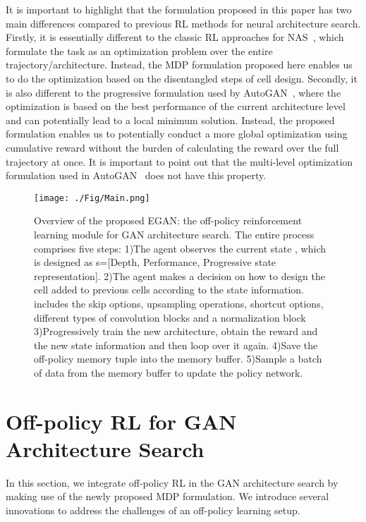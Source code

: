 \documentclass[runningheads]{llncs}
\begin{document}
It is important to highlight that the  formulation proposed in this paper has two main differences compared to previous RL methods for neural architecture search. Firstly, it is essentially different to the classic RL approaches for NAS~\cite{zoph2016neural}, which formulate the task as an optimization problem over the entire trajectory/architecture. Instead, the MDP formulation proposed here enables us to do the optimization based on the disentangled steps of cell design. Secondly, it is also different to the progressive formulation used by AutoGAN~\cite{gong2019autogan}, where the optimization is based on the best performance of the current architecture level and can potentially lead to a local minimum solution. Instead, the proposed formulation enables us to potentially conduct a more global optimization using cumulative reward without the burden of calculating the reward over the full trajectory at once. It is important to point out that the multi-level optimization formulation used in AutoGAN~\cite{gong2019autogan} does not have this property. 



\begin{figure}[htbp]
    \centering
    \texttt{[image: ./Fig/Main.png]}
    \caption{Overview of the proposed EGAN: the off-policy reinforcement learning module for GAN architecture search. The entire process comprises five steps: 1)The agent observes the current state , which is designed as  s=[Depth, Performance, Progressive state representation]. 2)The agent makes a decision  on how to design the cell added to previous cells according to the state information.   includes the skip options, upsampling operations, shortcut options, different types of convolution blocks and a normalization block 3)Progressively train the new architecture, obtain the reward  and the new state  information and then loop over it again. 4)Save the off-policy memory tuple  into the memory buffer. 5)Sample a batch of data from the memory buffer to update the policy network.}
\label{fig:main}
\end{figure}

\section{Off-policy RL for GAN Architecture Search}\label{sec:proposed method}

In this section, we integrate off-policy RL in the GAN architecture search by making use of the newly proposed MDP formulation. We introduce several innovations to address the challenges of an off-policy learning setup. 
\end{document}
